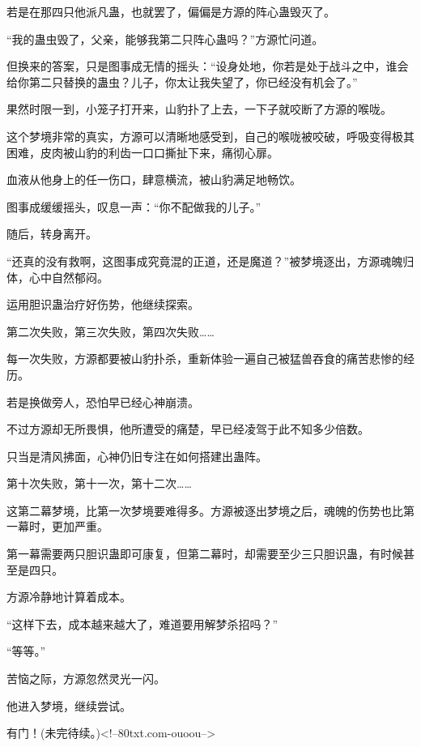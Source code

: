 \begin{this_body}
若是在那四只他派凡蛊，也就罢了，偏偏是方源的阵心蛊毁灭了。

“我的蛊虫毁了，父亲，能够我第二只阵心蛊吗？”方源忙问道。

但换来的答案，只是图事成无情的摇头：“设身处地，你若是处于战斗之中，谁会给你第二只替换的蛊虫？儿子，你太让我失望了，你已经没有机会了。”

果然时限一到，小笼子打开来，山豹扑了上去，一下子就咬断了方源的喉咙。

这个梦境非常的真实，方源可以清晰地感受到，自己的喉咙被咬破，呼吸变得极其困难，皮肉被山豹的利齿一口口撕扯下来，痛彻心扉。

血液从他身上的任一伤口，肆意横流，被山豹满足地畅饮。

图事成缓缓摇头，叹息一声：“你不配做我的儿子。”

随后，转身离开。

“还真的没有救啊，这图事成究竟混的正道，还是魔道？”被梦境逐出，方源魂魄归体，心中自然郁闷。

运用胆识蛊治疗好伤势，他继续探索。

第二次失败，第三次失败，第四次失败……

每一次失败，方源都要被山豹扑杀，重新体验一遍自己被猛兽吞食的痛苦悲惨的经历。

若是换做旁人，恐怕早已经心神崩溃。

不过方源却无所畏惧，他所遭受的痛楚，早已经凌驾于此不知多少倍数。

只当是清风拂面，心神仍旧专注在如何搭建出蛊阵。

第十次失败，第十一次，第十二次……

这第二幕梦境，比第一次梦境要难得多。方源被逐出梦境之后，魂魄的伤势也比第一幕时，更加严重。

第一幕需要两只胆识蛊即可康复，但第二幕时，却需要至少三只胆识蛊，有时候甚至是四只。

方源冷静地计算着成本。

“这样下去，成本越来越大了，难道要用解梦杀招吗？”

“等等。”

苦恼之际，方源忽然灵光一闪。

他进入梦境，继续尝试。

有门！(未完待续。)<!--80txt.com-ouoou-->

\end{this_body}

